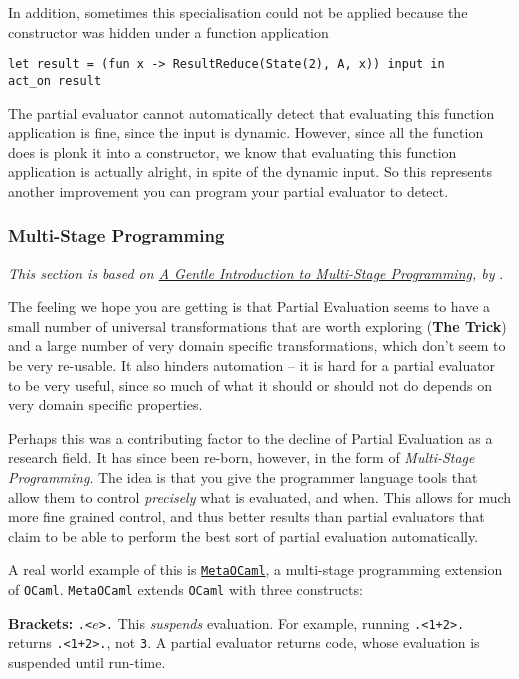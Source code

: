 In addition, sometimes this specialisation could not be applied because the constructor was hidden under a function application
\begin{verbatim}
let result = (fun x -> ResultReduce(State(2), A, x)) input in
act_on result
\end{verbatim}
The partial evaluator cannot automatically detect that evaluating this function application is fine, since the input is dynamic. However, since all the function does is plonk it into a constructor, we know that evaluating this function application is actually alright, in spite of the dynamic input. So this represents another improvement you can program your partial evaluator to detect.

\subsubsection{Multi-Stage Programming}
\textit{This section is based on \href{https://link.springer.com/chapter/10.1007/978-3-540-25935-0_3}{A Gentle Introduction to Multi-Stage Programming}, by} \citet{taha-2004}.

The feeling we hope you are getting is that Partial Evaluation seems to have a small number of universal transformations that are worth exploring (\textbf{The Trick}) and a large number of very domain specific transformations, which don't seem to be very re-usable. It also hinders automation -- it is hard for a partial evaluator to be very useful, since so much of what it should or should not do depends on very domain specific properties.

Perhaps this was a contributing factor to the decline of Partial Evaluation as a research field. It has since been re-born, however, in the form of \textit{Multi-Stage Programming}. The idea is that you give the programmer language tools that allow them to control \textit{precisely} what is evaluated, and when. This allows for much more fine grained control, and thus better results than partial evaluators that claim to be able to perform the best sort of partial evaluation automatically. 

A real world example of this is \href{https://okmij.org/ftp/ML/MetaOCaml.html}{\texttt{MetaOCaml}}, a multi-stage programming extension of \texttt{OCaml}. \texttt{MetaOCaml} extends \texttt{OCaml} with three constructs:

\textbf{Brackets:} \texttt{.<$e$>.} This \textit{suspends} evaluation. For example, running \texttt{.<1+2>.} returns \texttt{.<1+2>.}, not \texttt{3}. A partial evaluator returns code, whose evaluation is suspended until run-time.

